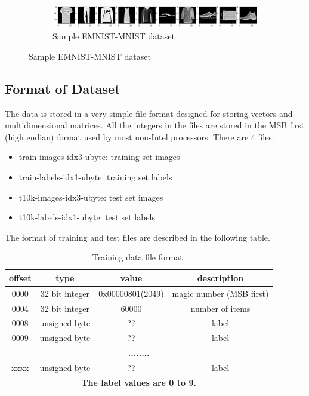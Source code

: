 \begin{figure}[htb!]
        \centering
        \begin{subfigure}[b]{\textwidth}
            \centering
            \includegraphics[width=\linewidth]{images/fashion.png}
            \caption{Sample EMNIST-MNIST dataset}
            \label{fig:EMNIST MNIST dataset}
        \end{subfigure}%
        \label{fig:Rotate-misclassifications}
    \end{figure}
    \FloatBarrier
    
\subsection{Format of Dataset}
The data is stored in a very simple file format designed for storing vectors and multidimensional matrices. All the integers in the files are stored in the MSB first (high endian) format used by most non-Intel processors. There are 4 files:
\begin{itemize}
  \item train-images-idx3-ubyte: training set images
  \item train-labels-idx1-ubyte: training set labels
  \item t10k-images-idx3-ubyte:  test set images
  \item t10k-labels-idx1-ubyte:  test set labels
\end{itemize}
The format of training and test files are described in the following table.
\begin{table}[ht]
\centering
\begin{tabular}{|c|c|c|c|}
\hline
\textbf{offset} & \textbf{type}    &      \textbf{value}    &      \textbf{description} \\
\hline
0000  &   32 bit integer & 0x00000801(2049) & magic number (MSB first) \\
\hline
0004  &   32 bit integer & 60000       &     number of items \\
\hline
0008  &   unsigned byte  & ??          &     label \\
\hline
0009  &   unsigned byte  & ??          &     label \\
\hline
\multicolumn{4}{|c|}{\textbf{........}} \\
\hline
xxxx  &   unsigned byte  & ??          &     label \\
\hline
\multicolumn{4}{|c|}{\textbf{The label values are 0 to 9.}} \\
\hline
\end{tabular}
\caption{Training data file format.}
\label{tbl:training-file-format}
\end{table}

